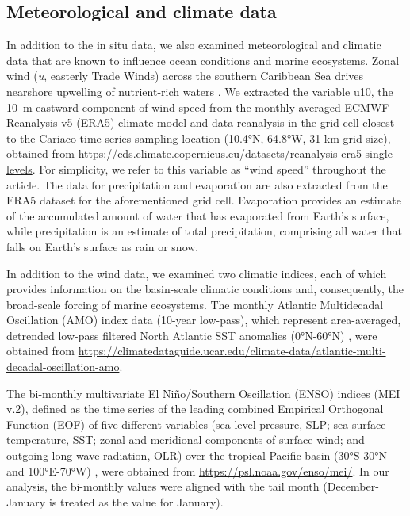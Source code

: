 \documentclass[draft]{agujournal2019}
\begin{document}
\subsection{Meteorological and climate data}
    In addition to the in situ data, we also examined meteorological and climatic data that are known to influence ocean conditions and marine ecosystems. Zonal wind (\textit{u}, easterly Trade Winds) across the southern Caribbean Sea drives nearshore upwelling of nutrient-rich waters \cite{rueda-roa_southern_2013}. We extracted the variable u10, the \qty{10}{\meter} eastward component of wind speed from the monthly averaged ECMWF Reanalysis v5 (ERA5) climate model and data reanalysis \cite{hersbach2023era5} in the grid cell closest to the Cariaco time series sampling location (\ang{10.4}N, \ang{64.8}W, 31 km grid size), obtained from \url{https://cds.climate.copernicus.eu/datasets/reanalysis-era5-single-levels}. For simplicity, we refer to this variable as ``wind speed'' throughout the article. The data for precipitation and evaporation are also extracted from the ERA5 dataset for the aforementioned grid cell. Evaporation provides an estimate of the accumulated amount of water that has evaporated from Earth's surface, while precipitation is an estimate of total precipitation, comprising all water that falls on Earth's surface as rain or snow. 
    
    In addition to the wind data, we examined two climatic indices, each of which provides information on the basin-scale climatic conditions and, consequently, the broad-scale forcing of marine ecosystems. The monthly Atlantic Multidecadal Oscillation (AMO) index data (10-year low-pass), which represent area-averaged, detrended low-pass filtered North Atlantic SST anomalies (\ang{0}N-\ang{60}N) \cite{trenberth2023amo}, were obtained from \url{https://climatedataguide.ucar.edu/climate-data/atlantic-multi-decadal-oscillation-amo}. 
    
    The bi-monthly multivariate El Niño/Southern Oscillation (ENSO) indices (MEI v.2), defined as the time series of the leading combined Empirical Orthogonal Function (EOF) of five different variables (sea level pressure, SLP; sea surface temperature, SST; zonal and meridional components of surface wind; and outgoing long-wave radiation, OLR) over the tropical Pacific basin (\ang{30}S-\ang{30}N and \ang{100}E-\ang{70}W) \cite{noaa_psl_meiv2}, were obtained from \url{https://psl.noaa.gov/enso/mei/}. In our analysis, the bi-monthly values were aligned with the tail month (December-January is treated as the value for January).
    
\end{document}
